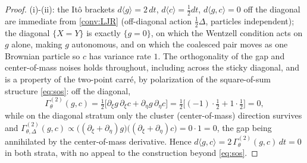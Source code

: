\documentclass[reqno,final,11pt]{amsart}
\theoremstyle{plain}
\theoremstyle{definition}
\theoremstyle{remark}
\begin{document}
\begin{proof}
(i)-(ii): the It\^o brackets $d\langle g\rangle=2\,dt$, $d\langle c\rangle=\tfrac12 dt$,
$d\langle g,c\rangle=0$ off the diagonal are immediate from \cref{conv:LJR} (off-diagonal
action $\tfrac12\Delta$, particles independent); the diagonal $\{X=Y\}$ is exactly
$\{g=0\}$, on which the Wentzell condition acts on $g$ alone, making $g$ autonomous, and
on which the coalesced pair moves as one Brownian particle so $c$ has variance rate $1$.
The orthogonality of the gap and center-of-mass noises holds throughout,
including across the sticky diagonal, and is a property of the two-point carr\'e,
by polarization of the square-of-sum structure \eqref{eq:sos}: off the diagonal,
\[
  \Gamma^{(2)}_\theta(g,c)
  =\tfrac12\bigl[\partial_\xi g\,\partial_\xi c+\partial_\eta g\,\partial_\eta c\bigr]
  =\tfrac12\bigl[(-1)\cdot\tfrac12+1\cdot\tfrac12\bigr]=0,
\]
while on the diagonal stratum only the cluster (center-of-mass) direction
survives and
$\Gamma^{(2)}_{\theta,\Delta}(g,c)\propto\bigl((\partial_\xi+\partial_\eta)g\bigr)
\bigl((\partial_\xi+\partial_\eta)c\bigr)=0\cdot1=0$, the gap being annihilated
by the center-of-mass derivative. Hence
$d\langle g,c\rangle=2\,\Gamma^{(2)}_\theta(g,c)\,dt=0$ in both strata, with no
appeal to the construction beyond \eqref{eq:sos}.


\end{proof}
\end{document}
